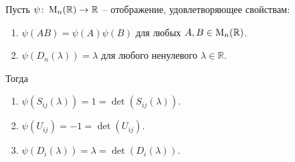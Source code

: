 \begin{claim}
\label{claim::MultiOnElementary}
Пусть $\psi\colon \operatorname{M}_{n}(\mathbb R)\to \mathbb R$ -- отображение, удовлетворяющее свойствам:
\begin{enumerate}
\item $\psi(AB) = \psi(A)\psi(B)$ для любых $A,B\in\operatorname{M}_{n}(\mathbb R)$.

\item $\psi(D_n(\lambda)) = \lambda$ для любого ненулевого $\lambda\in\mathbb R$.
\end{enumerate}
Тогда
\begin{enumerate}
\item $\psi(S_{ij}(\lambda)) = 1 = \det(S_{ij}(\lambda))$.

\item $\psi(U_{ij}) = -1 = \det(U_{ij})$.

\item $\psi(D_i(\lambda)) = \lambda = \det(D_i(\lambda))$.
\end{enumerate}
\end{claim}
